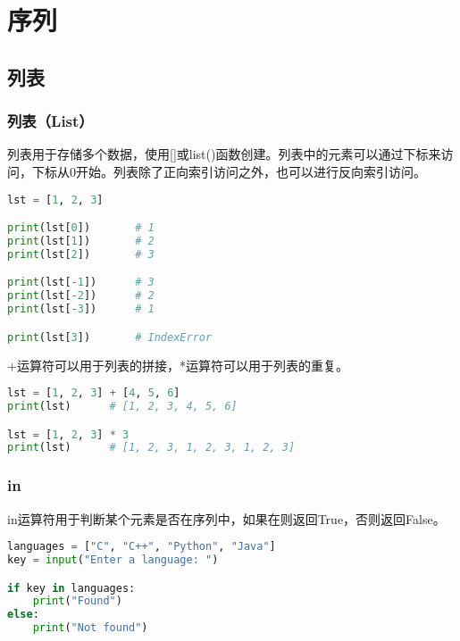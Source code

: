 \chapter{序列}

\section{列表}

\subsection{列表（List）}

列表用于存储多个数据，使用[]或list()函数创建。列表中的元素可以通过下标来访问，下标从0开始。列表除了正向索引访问之外，也可以进行反向索引访问。

\vspace{-0.5cm}

\begin{lstlisting}[language=Python]
lst = [1, 2, 3]

print(lst[0])		# 1
print(lst[1])		# 2
print(lst[2])		# 3

print(lst[-1])		# 3
print(lst[-2])		# 2
print(lst[-3])		# 1

print(lst[3])       # IndexError
\end{lstlisting}

+运算符可以用于列表的拼接，*运算符可以用于列表的重复。

\vspace{-0.5cm}

\begin{lstlisting}[language=Python]
lst = [1, 2, 3] + [4, 5, 6]
print(lst)      # [1, 2, 3, 4, 5, 6]

lst = [1, 2, 3] * 3
print(lst)      # [1, 2, 3, 1, 2, 3, 1, 2, 3]
\end{lstlisting}

\vspace{0.5cm}

\subsection{in}

in运算符用于判断某个元素是否在序列中，如果在则返回True，否则返回False。\\


\begin{lstlisting}[language=Python]
languages = ["C", "C++", "Python", "Java"]
key = input("Enter a language: ")

if key in languages:
	print("Found")
else:
	print("Not found")
\end{lstlisting}


